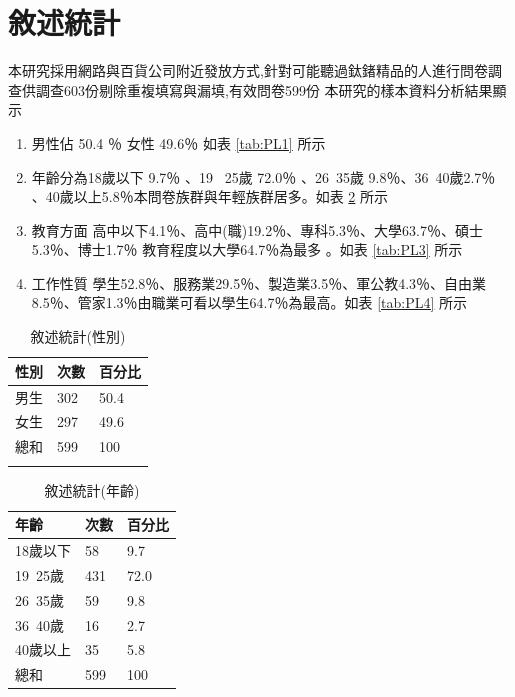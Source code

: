 \section{敘述統計}
本研究採用網路與百貨公司附近發放方式,針對可能聽過鈦鍺精品的人進行問卷調查供調查603份剔除重複填寫與漏填,有效問卷599份 
本研究的樣本資料分析結果顯示 
\begin{enumerate}
\item 男性佔 50.4 ％ 女性 49.6％ 如表 \ref{tab:PL1} 所示 
\item 年齡分為18歲以下 9.7％ 、19 ~25歲 72.0％ 、26~35歲 9.8％、36~40歲2.7％ 、40歲以上5.8％本問卷族群與年輕族群居多。如表  \ref{tab:PL2} 所示
\item 教育方面 高中以下4.1％、高中(職)19.2％、專科5.3％、大學63.7％、碩士5.3％、博士1.7％ 教育程度以大學64.7％為最多 。如表 \ref{tab:PL3} 所示
\item 工作性質 學生52.8％、服務業29.5％、製造業3.5％、軍公教4.3％、自由業8.5％、管家1.3％由職業可看以學生64.7％為最高。如表 \ref{tab:PL4} 所示
\end{enumerate}

\begin{table}[htb]
\caption{敘述統計(性別)}
\label{tab:PL1}
\renewcommand{\arraystretch}{1.2} %
\arrayrulewidth=1pt               %
\tabcolsep=60pt                   %
%
\begin{tabular}[t]{lll}  %
\hline
 性別&次數 & 百分比 \\
\hline
男生        & 302 & 50.4 \\
女生        & 297  & 49.6 \\
總和        & 599  & 100 \\
\hline
\centering
\label{fig:PL4}
\end{tabular}
\end{table}

\begin{table}[htb]
\caption{敘述統計(年齡)}
\label{tab:PL2}
\renewcommand{\arraystretch}{1.2} %
\arrayrulewidth=1pt               %
\tabcolsep=60pt                   %
%
\begin{tabular}[t]{lll}  %
\hline
 年齡& 次數 & 百分比 \\
\hline
18歲以下        & 58  & 9.7 \\
19~25歲        & 431  & 72.0 \\
26~35歲        & 59  & 9.8 \\
36~40歲        & 16  &2.7\\
40歲以上        & 35  & 5.8 \\
總和               & 599  & 100 \\
\hline
\end{tabular}
\end{table}

